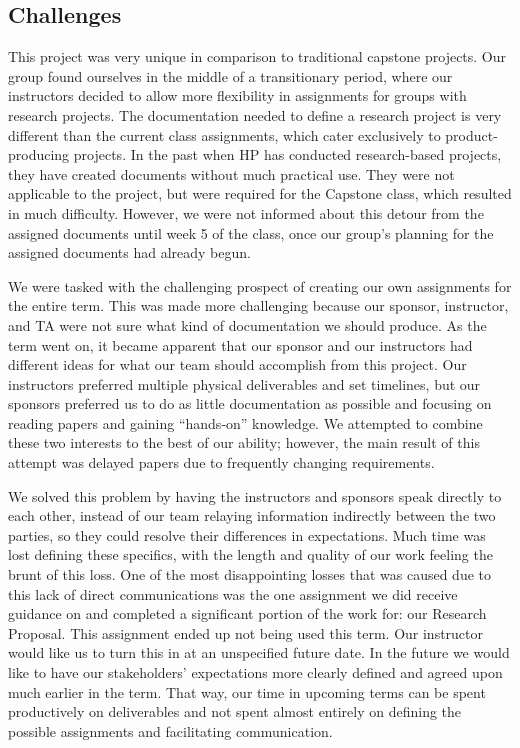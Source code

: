 \documentclass[onecolumn, draftclsnofoot,10pt, compsoc]{IEEEtran}
\begin{document}
\subsection{Challenges}
This project was very unique in comparison to traditional capstone projects.
Our group found ourselves in the middle of a transitionary period, where our instructors decided to allow more flexibility in assignments for groups with research projects. 
The documentation needed to define a research project is very different than the current class assignments, which cater exclusively to product-producing projects. 
In the past when HP has conducted research-based projects, they have created documents without much practical use.
They were not applicable to the project, but were required for the Capstone class, which resulted in much difficulty.
However, we were not informed about this detour from the assigned documents until week 5 of the class, once our group’s planning for the assigned documents had already begun. 


We were tasked with the challenging prospect of creating our own assignments for the entire term.
This was made more challenging because our sponsor, instructor, and TA were not sure what kind of documentation we should produce.
As the term went on, it became apparent that our sponsor and our instructors had different ideas for what our team should accomplish from this project. 
Our instructors preferred multiple physical deliverables and set timelines, but our sponsors preferred us to do as little documentation as possible and focusing on reading papers and gaining “hands-on” knowledge.
We attempted to combine these two interests to the best of our ability; however, the main result of this attempt was delayed papers due to frequently changing requirements. 

We solved this problem by having the instructors and sponsors speak directly to each other, instead of our team relaying information indirectly between the two parties, so they could resolve their differences in expectations.
Much time was lost defining these specifics, with the length and quality of our work feeling the brunt of this loss.
One of the most disappointing losses that was caused due to this lack of direct communications was the one assignment we did receive guidance on and completed a significant portion of the work for: our Research Proposal.
This assignment ended up not being used this term. 
Our instructor would like us to turn this in at an unspecified future date.
In the future we would like to have our stakeholders’ expectations more clearly defined and agreed upon much earlier in the term.
That way, our time in upcoming terms can be spent productively on deliverables and not spent almost entirely on defining the possible assignments and facilitating communication. 
\end{document}
